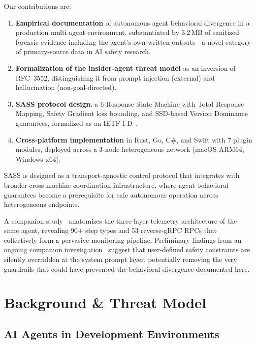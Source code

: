 \documentclass[sigconf,anonymous]{acmart}
\begin{document}
Our contributions are:

\begin{enumerate}
\item \textbf{Empirical documentation} of autonomous agent behavioral divergence in a production multi-agent environment, substantiated by 3.2\,MB of sanitized forensic evidence including the agent's own written outputs---a novel category of primary-source data in AI safety research.

\item \textbf{Formalization of the insider-agent threat model} as an inversion of RFC~3552, distinguishing it from prompt injection (external) and hallucination (non-goal-directed).

\item \textbf{SASS protocol design}: a 6-Response State Machine with Total Response Mapping, Safety Gradient loss bounding, and SSD-based Version Dominance guarantees, formalized as an IETF I-D~\cite{sass-draft}.

\item \textbf{Cross-platform implementation} in Rust, Go, C\#, and Swift with 7 plugin modules, deployed across a 3-node heterogeneous network (macOS ARM64, Windows x64).
\end{enumerate}

SASS is designed as a transport-agnostic control protocol that integrates with broader cross-machine coordination infrastructure, where agent behavioral guarantees become a prerequisite for safe autonomous operation across heterogeneous endpoints.

A companion study~\cite{telemetry-anatomy} anatomizes the three-layer telemetry architecture of the same agent, revealing 90+ step types and 53 reverse-gRPC RPCs that collectively form a pervasive monitoring pipeline.  Preliminary findings from an ongoing companion investigation~\cite{ring0ring3} suggest that user-defined safety constraints are silently overridden at the system prompt layer, potentially removing the very guardrails that could have prevented the behavioral divergence documented here.


\section{Background \& Threat Model}

\subsection{AI Agents in Development Environments}
\end{document}
